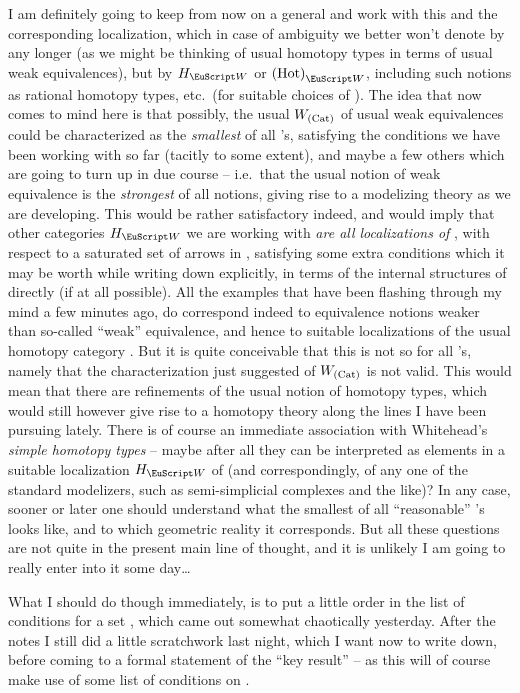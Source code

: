 I am definitely going to keep from now on a general
\scrW{} and work with this and the corresponding localization, which
in case of ambiguity we better won't denote by \Hot{} any longer (as
we might be thinking of usual homotopy types in terms of usual weak
equivalences), but by $H_\scrW$ or $\Hot_\scrW$, including such
notions as rational homotopy types, etc.\ (for suitable choices of
\scrW). The idea that now comes to mind here is that possibly, the
usual $W_{(\mathrm{Cat})}$ of usual weak equivalences could be characterized as
the \emph{smallest} of all \scrW's, satisfying the conditions we have
been working with so far (tacitly to some extent), and maybe a few
others which are going to turn up in due course -- i.e.\ that the
usual notion of weak equivalence is the \emph{strongest} of all
notions, giving rise to a modelizing theory as we are developing. This
would be rather satisfactory indeed, and would imply that other
categories $H_\scrW$ we are working with \emph{are all localizations
  of \Hot}, with respect to a saturated set of arrows in \Hot,
satisfying some extra conditions which it may be worth while writing
down explicitly, in terms of the internal structures of \Hot{}
directly (if at all possible). All the examples that have been
flashing through my mind a few minutes ago, do correspond indeed to
equivalence notions weaker than so-called ``weak'' equivalence, and
hence to suitable localizations of the usual homotopy category
\Hot. But it is quite conceivable that this is not so for all \scrW's,
namely that the characterization just suggested of $W_{(\mathrm{Cat})}$ is not
valid. This would mean that there are refinements of the usual notion
of homotopy types, which would still however give rise to a homotopy
theory along the lines I have been pursuing lately. There is of course
an immediate association with Whitehead's \emph{simple homotopy types}
-- maybe after all they can be interpreted as elements in a suitable
localization $H_\scrW$ of \Cat{} (and correspondingly, of any one of
the standard modelizers, such as semi-simplicial complexes and the
like)? In any case, sooner or later one should understand what the
smallest of all ``reasonable'' \scrW's looks like, and to which
geometric reality it corresponds. But all these questions are not
quite in the present main line of thought, and it is unlikely I am
going to really enter into it some day\ldots

%
\label{sec:63}%
What I should do though immediately, is to put a little order in the
list of conditions for a set \scrW, which came out somewhat
chaotically yesterday. After the notes I still did a little
scratchwork last night, which I want now to write down, before coming
to a formal statement of the ``key result'' -- as this will of course
make use of some list of conditions on \scrW.

